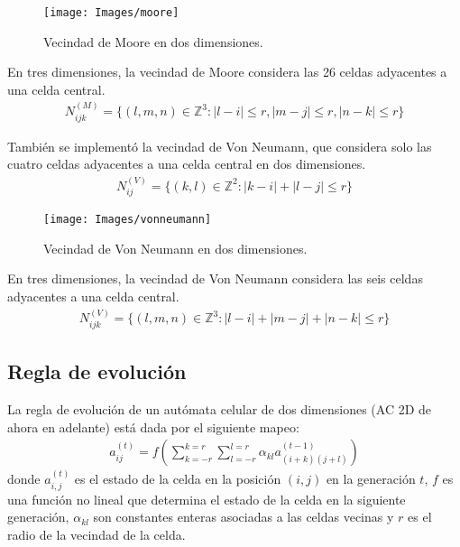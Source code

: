 \begin{figure}[H]
    \centering
    \texttt{[image: Images/moore]}
    \caption{Vecindad de Moore en dos dimensiones.}
    \label{fig:moore}
\end{figure}

En tres dimensiones, la vecindad de Moore considera las 26 celdas adyacentes a una celda central.
\begin{equation}
    \label{eq:moore_neighborhood_3d}
    \begin{aligned}
        N^{(M)}_{ijk} = \{(l,m,n) \in \mathbb{Z}^3 : |l-i| \leq r, |m-j| \leq r, |n-k| \leq r\}
    \end{aligned}
\end{equation}

También se implementó la vecindad de Von Neumann, que considera solo las cuatro celdas adyacentes a una celda central en dos dimensiones.
\begin{equation}
    \label{eq:von_neumann_neighborhood}
    \begin{aligned}
        N^{(V)}_{ij} = \{(k,l) \in \mathbb{Z}^2 : |k-i| + |l-j| \leq r\}
    \end{aligned}
\end{equation}

\begin{figure}[H]
    \centering
    \texttt{[image: Images/vonneumann]}
    \caption{Vecindad de Von Neumann en dos dimensiones.}
    \label{fig:vonneumann}
\end{figure}

En tres dimensiones, la vecindad de Von Neumann considera las seis celdas adyacentes a una celda central.
\begin{equation}
    \label{eq:von_neumann_neighborhood_3d}
    \begin{aligned}
        N^{(V)}_{ijk} = \{(l,m,n) \in \mathbb{Z}^3 : |l-i| + |m-j| + |n-k| \leq r\}
    \end{aligned}
\end{equation}


\subsection{Regla de evolución}
\label{subsec:evolucion}
La regla de evolución de un autómata celular de dos dimensiones (AC 2D de ahora en adelante) está dada por el siguiente mapeo:
\begin{equation}
    \label{eq:evolution_rule}
    \begin{aligned}
        a_{ij}^{(t)} = f(\sum^{k=r}_{k=-r}\sum^{l=r}_{l=-r}{\alpha_{kl}a_{(i+k)(j+l)}^{(t-1)}})
    \end{aligned}
\end{equation}
donde $a_{i,j}^{(t)}$ es el estado de la celda en la posición $(i,j)$ en la generación $t$, $f$ es una función no lineal que determina el estado de la celda en la siguiente generación, $\alpha_{kl}$ son constantes enteras asociadas a las celdas vecinas y $r$ es el radio de la vecindad de la celda.

